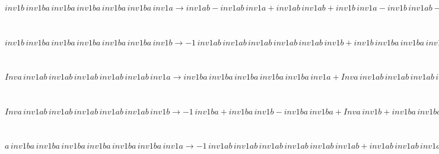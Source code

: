 \begin{minipage}{6in}
$
inv1b\,
 inv1ba\,
 inv1ba\,
 inv1ba\,
 inv1ba\,
 inv1ba\,
 inv1a\rightarrow inv1ab - inv1ab\,
 inv1a + inv1ab\,
 inv1ab + inv1b\,
 inv1a - inv1b\,
 inv1ab - inv1ab\,
 inv1ab\,
 inv1a + inv1ab\,
 inv1ab\,
 inv1ab + inv1b\,
 inv1ab\,
 inv1a - inv1b\,
 inv1ab\,
 inv1ab - inv1ab\,
 inv1ab\,
 inv1ab\,
 inv1a + inv1ab\,
 inv1ab\,
 inv1ab\,
 inv1ab + inv1b\,
 inv1ab\,
 inv1ab\,
 inv1a - inv1b\,
 inv1ab\,
 inv1ab\,
 inv1ab - inv1ab\,
 inv1ab\,
 inv1ab\,
 inv1ab\,
 inv1a + inv1ab\,
 inv1ab\,
 inv1ab\,
 inv1ab\,
 inv1ab + inv1b\,
 inv1ab\,
 inv1ab\,
 inv1ab\,
 inv1a - inv1b\,
 inv1ab\,
 inv1ab\,
 inv1ab\,
 inv1ab - inv1ab\,
 inv1ab\,
 inv1ab\,
 inv1ab\,
 inv1ab\,
 inv1a + inv1b\,
 inv1ab\,
 inv1ab\,
 inv1ab\,
 inv1ab\,
 inv1a - inv1b\,
 inv1ab\,
 inv1ab\,
 inv1ab\,
 inv1ab\,
 inv1ab + inv1b\,
 inv1ab\,
 inv1ab\,
 inv1ab\,
 inv1ab\,
 inv1ab\,
 inv1a
$
\end{minipage}\medskip \\
\begin{minipage}{6in}
$
inv1b\,
 inv1ba\,
 inv1ba\,
 inv1ba\,
 inv1ba\,
 inv1ba\,
 inv1b\rightarrow -1\,
 inv1ab\,
 inv1ab\,
 inv1ab\,
 inv1ab\,
 inv1ab\,
 inv1b + inv1b\,
 inv1ba\,
 inv1ba\,
 inv1ba\,
 inv1ba\,
 inv1ba + inv1b\,
 inv1ab\,
 inv1ab\,
 inv1ab\,
 inv1ab\,
 inv1ab\,
 inv1b
$
\end{minipage}\medskip \\
\begin{minipage}{6in}
$
Inva\,
 inv1ab\,
 inv1ab\,
 inv1ab\,
 inv1ab\,
 inv1ab\,
 inv1a\rightarrow inv1ba\,
 inv1ba\,
 inv1ba\,
 inv1ba\,
 inv1ba\,
 inv1a + Inva\,
 inv1ab\,
 inv1ab\,
 inv1ab\,
 inv1ab\,
 inv1ab
$
\end{minipage}\medskip \\
\begin{minipage}{6in}
$
Inva\,
 inv1ab\,
 inv1ab\,
 inv1ab\,
 inv1ab\,
 inv1ab\,
 inv1b\rightarrow -1\,
 inv1ba + inv1ba\,
 inv1b - inv1ba\,
 inv1ba + Inva\,
 inv1b + inv1ba\,
 inv1ba\,
 inv1b - inv1ba\,
 inv1ba\,
 inv1ba + inv1ba\,
 inv1ba\,
 inv1ba\,
 inv1b - inv1ba\,
 inv1ba\,
 inv1ba\,
 inv1ba + inv1ba\,
 inv1ba\,
 inv1ba\,
 inv1ba\,
 inv1b - inv1ba\,
 inv1ba\,
 inv1ba\,
 inv1ba\,
 inv1ba + inv1ba\,
 inv1ba\,
 inv1ba\,
 inv1ba\,
 inv1ba\,
 inv1b
$
\end{minipage}\medskip \\
\begin{minipage}{6in}
$
a\,
 inv1ba\,
 inv1ba\,
 inv1ba\,
 inv1ba\,
 inv1ba\,
 inv1ba\,
 inv1a\rightarrow -1\,
 inv1ab\,
 inv1ab\,
 inv1ab\,
 inv1ab\,
 inv1ab\,
 inv1ab + inv1ab\,
 inv1ab\,
 inv1ab\,
 inv1ab\,
 inv1ab\,
 inv1ab\,
 inv1a
$
\end{minipage}\medskip \\
